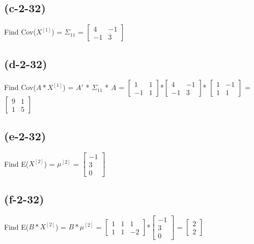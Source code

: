 \documentclass{article}
\begin{document}
\subsection{(c-2-32)}
Find Cov($X^{[1]}$) = $\Sigma_{11}$ = $\left[ 
\begin{array}{cc}
    4 & -1 \\
    -1 & 3
\end{array}
\right]$\newline
\subsection{(d-2-32)}
Find Cov($A*X^{[1]}$) = $A'$ *  $\Sigma_{11}$ * $A$ = $\left[
\begin{array}{cc}
1 & 1 \\
-1 & 1
\end{array}
\right]
$*$\left[ 
\begin{array}{cc}
4 & -1 \\
-1 & 3
\end{array}
\right]$* $\left[
\begin{array}{cc}
1 & -1 \\
1 & 1
\end{array}
\right]
$ = $\left[ 
\begin{array}{cc}
9 & 1 \\
1 & 5
\end{array}
\right]$\newline
\subsection{(e-2-32)}
Find E($X^{[2]} $) = $\mu^ {[2] }$ = $\left[
\begin{array}{c}
-1\\
3\\
0
\end{array}
\right]
$\newline
\subsection{(f-2-32)}
Find  E($B*X^{[2]} $) = $B*\mu^{[2]}$ = $\left[
\begin{array}{ccc}
1 & 1 &1 \\
1 & 1 &-2
\end{array}
\right]
$*$\left[
\begin{array}{c}
-1\\
3\\
0
\end{array}
\right]
$ = $\left[
\begin{array}{c}
2\\
2
\end{array}
\right]
$\newline
\end{document}

